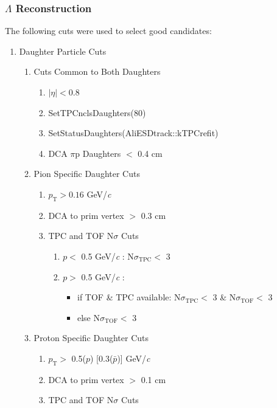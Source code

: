 \documentclass[../AnalysisNoteJBuxton.tex]{subfiles}
\begin{document}
\subsubsection{\texorpdfstring{$\Lambda$}{TEXT} Reconstruction}
\label{LambdaReconstruction}

The following cuts were used to select good \LamALam candidates:

\begin{enumerate}
 \item Daughter Particle Cuts
 \begin{enumerate}
  \item{Cuts Common to Both Daughters}
  \begin{enumerate}
   \item $|\eta| < 0.8$
   \item SetTPCnclsDaughters(80)
   \item SetStatusDaughters(AliESDtrack::kTPCrefit)
   \item DCA $\pi$p Daughters $<$ 0.4 cm
  \end{enumerate}
  \item Pion Specific Daughter Cuts 
  \begin{enumerate}
   \item $p_{\mathrm{T}} > 0.16$ GeV/\textit{c}
   \item DCA to prim vertex $>$ 0.3 cm
   \item TPC and TOF N$\sigma$ Cuts
   \begin{enumerate}
    \item $p <$ 0.5 GeV/\textit{c} : N$\sigma_{\mathrm{TPC}} <$ 3
    \item $p >$ 0.5 GeV/\textit{c} :
    \begin{itemize}
     \item if TOF \& TPC available: N$\sigma_{\mathrm{TPC}} <$ 3 \& N$\sigma_{\mathrm{TOF}} <$ 3
     \item else N$\sigma_{\mathrm{TOF}} <$ 3
    \end{itemize}
   \end{enumerate}
  \end{enumerate}
  \item Proton Specific Daughter Cuts
  \begin{enumerate}
   \item $p_{\mathrm{T}} > $ 0.5($p$) [0.3($\bar{p}$)] GeV/\textit{c}
   \item DCA to prim vertex $>$ 0.1 cm
   \item TPC and TOF N$\sigma$ Cuts
   \begin{enumerate}

\end{enumerate}
\end{enumerate}
\end{enumerate}
\end{enumerate}
\end{document}
